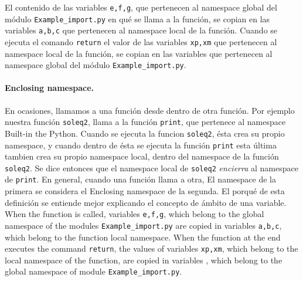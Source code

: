 \begin{paracol}{2}
El contenido de las variables \texttt{e,f,g}, que pertenecen al namespace global del módulo \texttt{Example_import.py} en qué se llama a la función, se copian en las variables \texttt{a,b,c} que pertenecen al namespace local de la función. Cuando se ejecuta el comando \texttt{return} el valor de las variables \texttt{xp,xm} que pertenecen al namespace local de la función, se copian en las variables que pertenecen al namespace global del módulo \texttt{Example_import.py}.

\paragraph{Enclosing namespace.} En ocasiones, llamamos a una función desde dentro de  otra función. Por ejemplo nuestra función \texttt{soleq2}, llama a la función \texttt{print}, que pertenece al namespace Built-in the Python. Cuando se ejecuta la funcion \texttt{soleq2}, ésta crea su propio namespace, y cuando dentro de ésta se ejecuta la función \texttt{print} esta última tambien crea su propio namespace local, dentro del namespace de la función \texttt{soleq2}. Se dice entonces que el namespace local de \texttt{soleq2} \emph{encierra} al namespace de \texttt{print}. 
En general, cuando una función llama a otra, El namespace de la primera se considera el Enclosing namespace de la segunda. El porqué de esta definición se entiende mejor explicando el concepto de ámbito de una variable.
\switchcolumn
When the function is called, variables \texttt{e,f,g}, which belong to the global namespace of the modules \texttt{Example_import.py} are copied in variables  \texttt{a,b,c}, which belong to the function local namespace. When the function at the end executes the command \texttt{return}, the values of variables \texttt{xp,xm}, which belong to the local namespace of the function, are copied in variables , which belong to the global namespace of module \texttt{Example_import.py}.


\end{paracol}

